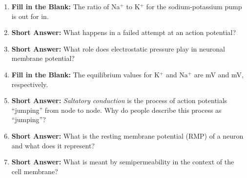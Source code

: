 \begin{enumerate}[label=\textbf{Q2.3.\arabic*}]
      \item \textbf{Fill in the Blank:} The ratio of Na\(^{+}\) to K\(^{+}\) for the sodium-potassium pump is \underline{\hspace{0.5cm}} out for \underline{\hspace{0.5cm}} in. \\

      \item \textbf{Short Answer:} What happens in a failed attempt at an action potential? \\

      \item \textbf{Short Answer:} What role does electrostatic pressure play in neuronal membrane potential? \\
      \item \textbf{Fill in the Blank:} The equilibrium values for K\(^{+}\) and Na\(^{+}\) are \underline{\hspace{0.5cm}} mV and \underline{\hspace{0.5cm}} mV, respectively. \\

      \item \textbf{Short Answer:} \textit{Saltatory conduction} is the process of action potentials ``jumping'' from node to node. Why do people describe this process as ``jumping''? \\

      \item \textbf{Short Answer:} What is the resting membrane potential (RMP) of a neuron and what does it represent? \\ 

      \item \textbf{Short Answer:} What is meant by semipermeability in the context of the cell membrane? \\


\end{enumerate}

